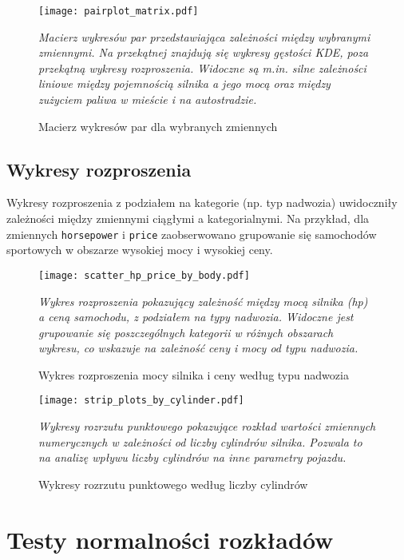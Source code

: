 \documentclass[12pt,a4paper]{article}
\begin{document}
\begin{figure}[H]
    \centering
    \texttt{[image: pairplot\_matrix.pdf]}
    \caption{Macierz wykresów par dla wybranych zmiennych}
    \label{fig:pairplot_matrix}
    \small\textit{Macierz wykresów par przedstawiająca zależności między wybranymi zmiennymi. Na przekątnej znajdują się wykresy gęstości KDE, poza przekątną wykresy rozproszenia. Widoczne są m.in. silne zależności liniowe między pojemnością silnika a jego mocą oraz między zużyciem paliwa w mieście i na autostradzie.}
\end{figure}

\subsection{Wykresy rozproszenia}

Wykresy rozproszenia z podziałem na kategorie (np. typ nadwozia) uwidoczniły zależności między zmiennymi ciągłymi a kategorialnymi. Na przykład, dla zmiennych \texttt{horsepower} i \texttt{price} zaobserwowano grupowanie się samochodów sportowych w obszarze wysokiej mocy i wysokiej ceny.

\begin{figure}[H]
    \centering
    \texttt{[image: scatter\_hp\_price\_by\_body.pdf]}
    \caption{Wykres rozproszenia mocy silnika i ceny według typu nadwozia}
    \label{fig:scatter_by_category}
    \small\textit{Wykres rozproszenia pokazujący zależność między mocą silnika (hp) a ceną samochodu, z podziałem na typy nadwozia. Widoczne jest grupowanie się poszczególnych kategorii w różnych obszarach wykresu, co wskazuje na zależność ceny i mocy od typu nadwozia.}
\end{figure}

\begin{figure}[H]
    \centering
    \texttt{[image: strip\_plots\_by\_cylinder.pdf]}
    \caption{Wykresy rozrzutu punktowego według liczby cylindrów}
    \label{fig:strip_plots}
    \small\textit{Wykresy rozrzutu punktowego pokazujące rozkład wartości zmiennych numerycznych w zależności od liczby cylindrów silnika. Pozwala to na analizę wpływu liczby cylindrów na inne parametry pojazdu.}
\end{figure}

\section{Testy normalności rozkładów}
\end{document}
